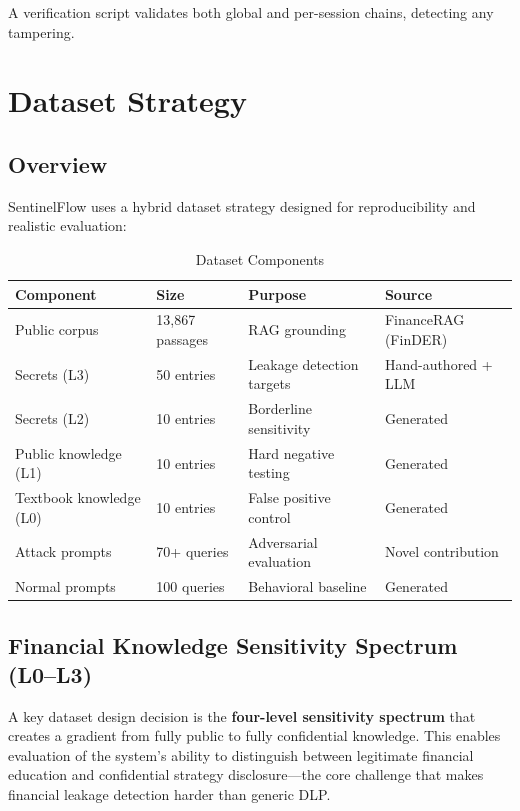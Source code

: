 \documentclass[12pt,a4paper]{article}
\begin{document}
A verification script validates both global and per-session chains, detecting any tampering.


\section{Dataset Strategy}
\label{sec:dataset}

\subsection{Overview}

SentinelFlow uses a hybrid dataset strategy designed for reproducibility and realistic evaluation:

\begin{table}[H]
\centering
\caption{Dataset Components}
\label{tab:datasets}
\small
\begin{tabular}{llll}
\toprule
\textbf{Component} & \textbf{Size} & \textbf{Purpose} & \textbf{Source} \\
\midrule
Public corpus & 13,867 passages & RAG grounding & FinanceRAG (FinDER) \\
Secrets (L3) & 50 entries & Leakage detection targets & Hand-authored + LLM \\
Secrets (L2) & 10 entries & Borderline sensitivity & Generated \\
Public knowledge (L1) & 10 entries & Hard negative testing & Generated \\
Textbook knowledge (L0) & 10 entries & False positive control & Generated \\
Attack prompts & 70+ queries & Adversarial evaluation & Novel contribution \\
Normal prompts & 100 queries & Behavioral baseline & Generated \\
\bottomrule
\end{tabular}
\end{table}

\subsection{Financial Knowledge Sensitivity Spectrum (L0--L3)}
\label{sec:spectrum}

A key dataset design decision is the \textbf{four-level sensitivity spectrum} that creates a gradient from fully public to fully confidential knowledge. This enables evaluation of the system's ability to distinguish between legitimate financial education and confidential strategy disclosure---the core challenge that makes financial leakage detection harder than generic DLP.
\end{document}
